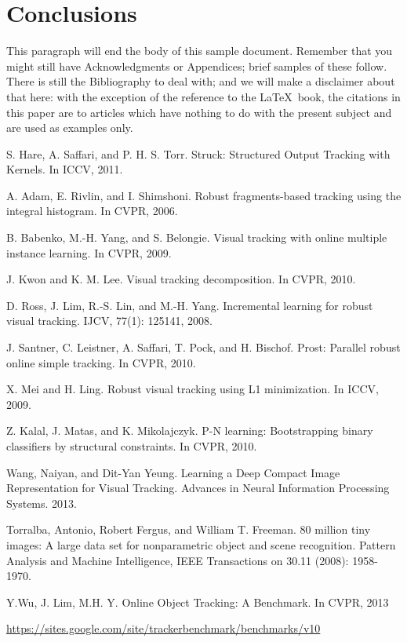 \documentclass{acm_proc_article-sp}
\begin{document}
\section{Conclusions}
This paragraph will end the body of this sample document.
Remember that you might still have Acknowledgments or
Appendices; brief samples of these
follow.  There is still the Bibliography to deal with; and
we will make a disclaimer about that here: with the exception
of the reference to the \LaTeX\ book, the citations in
this paper are to articles which have nothing to
do with the present subject and are used as
examples only.


\begin{thebibliography}{99}
S. Hare, A. Saffari, and P. H. S. Torr. Struck: Structured Output Tracking with Kernels. In ICCV, 2011.

A. Adam, E. Rivlin, and I. Shimshoni. Robust fragments-based tracking using the integral histogram. In CVPR, 2006.

B. Babenko, M.-H. Yang, and S. Belongie. Visual tracking with online multiple instance learning. In CVPR, 2009.

J. Kwon and K. M. Lee. Visual tracking decomposition. In CVPR, 2010.

D. Ross, J. Lim, R.-S. Lin, and M.-H. Yang. Incremental learning for robust visual tracking. IJCV, 77(1): 125141, 2008.

J. Santner, C. Leistner, A. Saffari, T. Pock, and H. Bischof. Prost: Parallel robust online simple tracking. In CVPR, 2010.

X. Mei and H. Ling. Robust visual tracking using L1 minimization. In ICCV, 2009.

Z. Kalal, J. Matas, and K. Mikolajczyk. P-N learning: Bootstrapping binary classifiers by structural constraints. In CVPR, 2010.

Wang, Naiyan, and Dit-Yan Yeung. Learning a Deep Compact Image Representation for Visual Tracking. Advances in Neural Information Processing Systems. 2013.

Torralba, Antonio, Robert Fergus, and William T. Freeman. 80 million tiny images: A large data set for nonparametric object and scene recognition. Pattern Analysis and Machine Intelligence, IEEE Transactions on 30.11 (2008): 1958-1970.

Y.Wu, J. Lim, M.H. Y. Online Object Tracking: A Benchmark. In CVPR, 2013

\url{https://sites.google.com/site/trackerbenchmark/benchmarks/v10}

\end{thebibliography}
\end{document}
